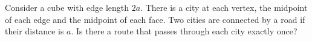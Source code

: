 Consider a cube with edge length $2a$. There is a city at each vertex,
the midpoint of each edge and the midpoint of each face. Two cities are connected by a
road if their distance is $a$. Is there a route that passes through each city exactly once?